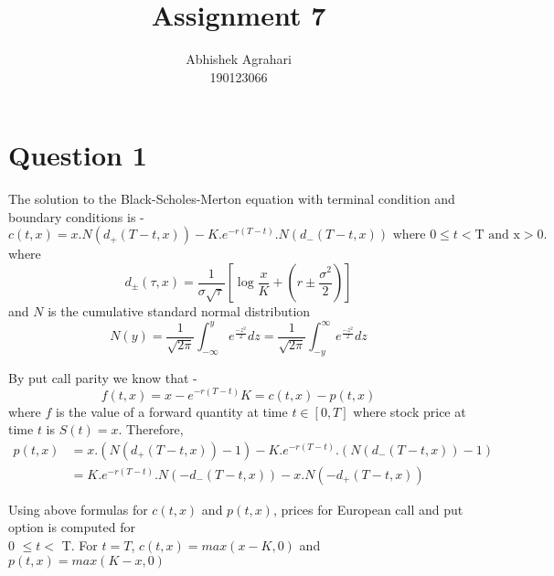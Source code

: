 \documentclass[12pt]{article}
\title{Assignment 7}
\author{Abhishek Agrahari\\190123066}
\date{}
\begin{document}
\maketitle

\section*{Question 1} 
The solution to the Black-Scholes-Merton equation with terminal condition and boundary conditions is - 
$$ c(t,x) = x.N(d_+(T-t,x)) - K.e^{-r(T-t)}.N(d_-(T-t,x)) \text{ where 0} \leq t < \text{T and x} > 0.$$
where $$ d_{\pm}(\tau,x) = \frac{1}{\sigma \sqrt{\tau}}\left[ \log\frac{x}{K} + (r \pm \frac{\sigma^2}{2}) \right]$$
and $N$ is the  cumulative standard normal distribution
$$N(y) = \frac{1}{\sqrt{2\pi}}\int_{-\infty}^y e^{\frac{-z^2}{2}} dz = \frac{1}{\sqrt{2\pi}}\int_{-y}^\infty e^{\frac{-z^2}{2}} dz$$

\noindent By put call parity we know that - 
$$ f(t,x) = x - e^{-r(T-t)}K = c(t,x) - p(t,x)$$
where $f$ is the value of a forward quantity at time $t \in [0,T]$ where stock price at time $t$ is $S(t) = x$.
Therefore, 
\begin{align*}
p(t,x) &= x.(N(d_+(T-t,x))-1) - K.e^{-r(T-t)}.(N(d_-(T-t,x))-1)\\
 &= K.e^{-r(T-t)}.N(-d_-(T-t,x)) - x.N(-d_+(T-t,x))
\end{align*}

\noindent Using above formulas for $c(t,x)$ and $p(t,x)$, prices for European call and put option is computed for \\ 0 $\leq t <$ T. For $t = T$, $c(t,x) = max(x-K, 0)$ and $p(t,x) = max(K-x,0)$
\end{document}
